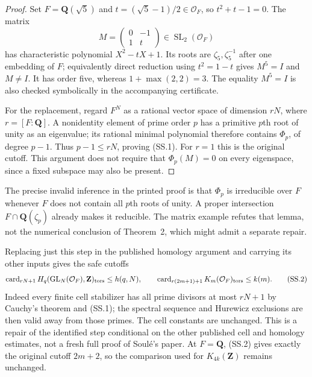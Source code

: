 \documentclass[11pt,a4paper]{article}
\theoremstyle{definition}
\begin{document}
\begin{proof}
Set $F=\mathbf Q(\sqrt5)$ and
$t=(\sqrt5-1)/2\in\mathcal O_F$, so $t^2+t-1=0$.
The matrix
\[
              M=\begin{pmatrix}0&-1\\1&t\end{pmatrix}
                \in\operatorname{SL}_2(\mathcal O_F)
\]
has characteristic polynomial $X^2-tX+1$.
Its roots are $\zeta_5,\zeta_5^{-1}$ after one embedding
of $F$; equivalently direct reduction using $t^2=1-t$
gives $M^5=I$ and $M\ne I$. It has order five, whereas
$1+\max(2,2)=3$. The equality $M^5=I$ is also checked
symbolically in the accompanying certificate.

For the replacement, regard $F^N$ as a rational vector space
of dimension $rN$, where $r=[F:\mathbf Q]$. A nonidentity
element of prime order $p$ has a primitive $p$th root of
unity as an eigenvalue; its rational minimal polynomial
therefore contains $\Phi_p$, of degree $p-1$.
Thus $p-1\leq rN$, proving (SS.1). For $r=1$ this is
the original cutoff. This argument does not require that
$\Phi_p(M)=0$ on every eigenspace, since a fixed subspace
may also be present.
\end{proof}

The precise invalid inference in the printed proof is that
$\Phi_p$ is irreducible over $F$ whenever $F$ does not
contain all $p$th roots of unity. A proper intersection
$F\cap\mathbf Q(\zeta_p)$ already makes it reducible.
The matrix example refutes that lemma, not the numerical
conclusion of Theorem~2, which might admit a separate repair.

Replacing just this step in the published homology argument
and carrying its other inputs gives the safe cutoffs
\[
 \operatorname{card}_{rN+1}
 H_q(\operatorname{GL}_N(\mathcal O_F),\mathbf Z)_{\rm tors}
       \leq h(q,N),\qquad
 \operatorname{card}_{r(2m+1)+1}
 K_m(\mathcal O_F)_{\rm tors}\leq k(m).
                                                               \tag{SS.2}
\]
Indeed every finite cell stabilizer has all prime divisors
at most $rN+1$ by Cauchy's theorem and (SS.1); the spectral
sequence and Hurewicz exclusions are then valid away from
those primes. The cell constants are unchanged. This is
a repair of the identified step conditional on the other
published cell and homology estimates, not a fresh full
proof of Soul\'e's paper. At $F=\mathbf Q$, (SS.2) gives
exactly the original cutoff $2m+2$, so the comparison used
for $K_{4k}(\mathbf Z)$ remains unchanged.


\end{document}
